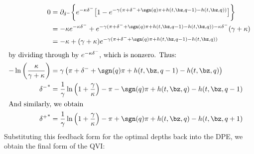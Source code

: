 \documentclass[12pt]{article}
\begin{document}
\begin{subequations}
\begin{align}
\label{eq:optdepthfeedbackcase2}
0 & = \partial_{\delta^-}\biggl\lbrace e^{ -\kappa \delta^{-}} \bigl[ 1 - e^{-\gamma(\pi + \delta^- + \sgn(q)\pi + h(t,\bz,q-1) - h(t,\bz,q))} \bigr] \biggr\rbrace \nonumber \\
& = -\kappa e^{ -\kappa \delta^{-}} + e^{-\gamma(\pi + \delta^- + \sgn(q)\pi + h(t,\bz,q-1) - h(t,\bz,q)) -\kappa \delta^-} (\gamma + \kappa) \nonumber \\
& = -\kappa + ( \gamma + \kappa ) e^{-\gamma(\pi + \delta^- + \sgn(q)\pi + h(t,\bz,q-1) - h(t,\bz,q))} \nonumber \\
\intertext{by dividing through by $e^{-\kappa \delta^-}$, which is nonzero. Thus:}
-\ln\left( \frac{\kappa}{\gamma + \kappa} \right) & = \gamma \left( \pi + \delta^- + \sgn(q)\pi + h(t,\bz,q-1) - h(t,\bz,q) \right) \nonumber \\
{\delta^-}^* & = \frac{1}{\gamma} \ln \left( 1 + \frac{\gamma}{\kappa}\right) - \pi - \sgn(q)\pi + h(t,\bz,q) - h(t,\bz,q-1) \\
\intertext{And similarly, we obtain}
{\delta^+}^* & = \frac{1}{\gamma} \ln \left( 1 + \frac{\gamma}{\kappa}\right) - \pi + \sgn(q)\pi + h(t,\bz,q) - h(t,\bz,q+1)
\end{align}
\end{subequations}
Substituting this feedback form for the optimal depths back into the DPE, we obtain the final form of the QVI:
\end{document}
